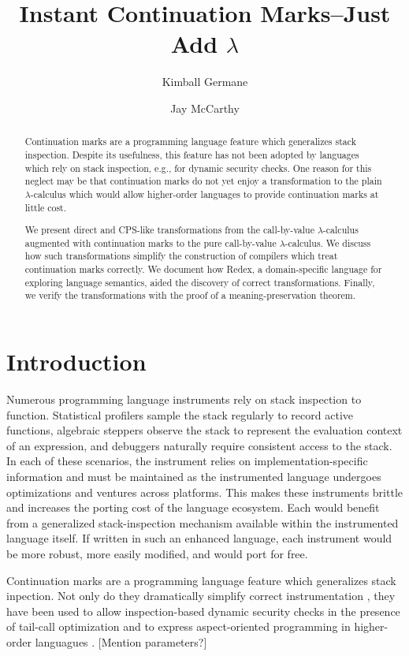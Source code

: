 \documentclass{llncs}
\title{Instant Continuation Marks--Just Add $\lambda$}
\author{Kimball Germane \and Jay McCarthy}
\institute{Brigham Young University, Provo, Utah}
\begin{document}
\maketitle

\begin{abstract}
Continuation marks are a programming language feature which generalizes stack inspection. Despite its usefulness, this feature has not been adopted by languages which rely on stack inspection, e.g., for dynamic security checks. One reason for this neglect may be that continuation marks do not yet enjoy a transformation to the plain $\lambda$-calculus which would allow higher-order languages to provide continuation marks at little cost.

We present direct and CPS-like transformations from the call-by-value $\lambda$-calculus augmented with continuation marks to the pure call-by-value $\lambda$-calculus. We discuss how such transformations simplify the construction of compilers which treat continuation marks correctly. We document how Redex, a domain-specific language for exploring language semantics, aided the discovery of correct transformations. Finally, we verify the transformations with the proof of a meaning-preservation theorem.
\end{abstract}

\section{Introduction}

Numerous programming language instruments rely on stack inspection to function. Statistical profilers sample the stack regularly to record active functions, algebraic steppers observe the stack to represent the evaluation context of an expression, and debuggers naturally require consistent access to the stack. In each of these scenarios, the instrument relies on implementation-specific information and must be maintained as the instrumented language undergoes optimizations and ventures across platforms. This makes these instruments brittle and increases the porting cost of the language ecosystem. Each would benefit from a generalized stack-inspection mechanism available within the instrumented language itself. If written in such an enhanced language, each instrument would be more robust, more easily modified, and would port for free.

Continuation marks \cite{clements2006portable} are a programming language feature which generalizes stack inpection. Not only do they dramatically simplify correct instrumentation \cite{clements2001modeling}, they have been used to allow inspection-based dynamic security checks in the presence of tail-call optimization \cite{clements2004tail} and to express aspect-oriented programming in higher-order languagues \cite{tucker2003pointcuts}. [Mention parameters?]
\end{document}
